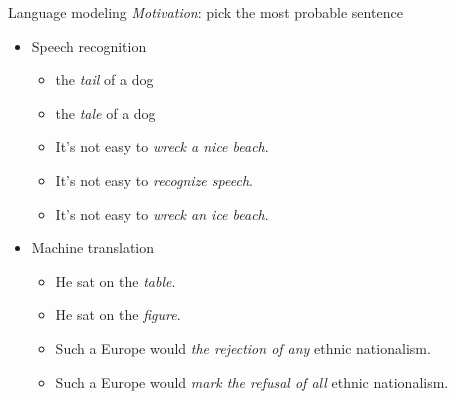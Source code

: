 \documentclass[usenames,dvipsnames,notes]{beamer}
\begin{document}
\begin{frame}
    {Language modeling}
    \emph{Motivation}: pick the most probable sentence
    \begin{itemize}
        \item Speech recognition
            \begin{itemize}
                \item[] the \textit{tail} of a dog
                \item[] the \textit{tale} of a dog
            \end{itemize}
            \begin{itemize}
                \item[] It's not easy to \textit{wreck a nice beach}. 
                \item[] It's not easy to \textit{recognize speech}. 
                \item[] It's not easy to \textit{wreck an ice beach}.
            \end{itemize}
        \item Machine translation 
            \begin{itemize}
                \item[] He sat on the \textit{table}.
                \item[] He sat on the \textit{figure}.
            \end{itemize}
            \begin{itemize}
                \item[] Such a Europe would \textit{the rejection of any} ethnic nationalism. 
                \item[] Such a Europe would \textit{mark the refusal of all} ethnic nationalism. 
            \end{itemize}
    \end{itemize}
\end{frame}
\end{document}
